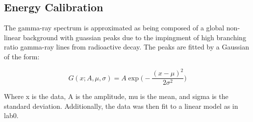 \subsection{Energy Calibration}

        The gamma-ray spectrum is approximated as being composed of a global non-linear background with guassian peaks due to the impingment of high branching ratio gamma-ray lines from radioactive decay.\cite{Knoll} The peaks are fitted by a Gaussian of the form:

\begin{equation}
G(x; A,\mu, \sigma) = A\exp\bigg(-\frac{(x-\mu)^2}{2\sigma^2}\bigg)
\end{equation}

Where x is the data, A is the amplitude, mu is the mean, and sigma is the standard deviation. Additionally, the data was then fit to a linear model as in lab0.  



